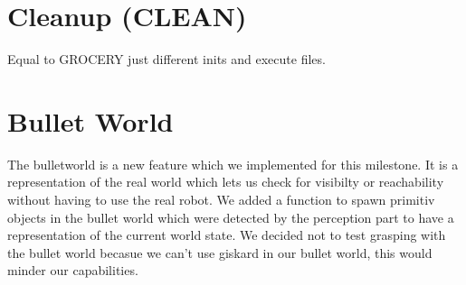 \documentclass[main.tex]{subfiles}
\begin{document}
                \section{Cleanup (CLEAN)}
                Equal to GROCERY just different inits and execute files.
                \section{Bullet World}
                The bulletworld is a new feature which we implemented for this milestone. It is a representation of the real world which lets us check for visibilty or reachability without having to use the real robot. We added a function to spawn primitiv objects in the bullet world which were detected by the perception part to have a representation of the current world state. We decided not to test grasping with the bullet world becasue we can't use giskard in our bullet world, this would minder our capabilities.
                
\end{document}

